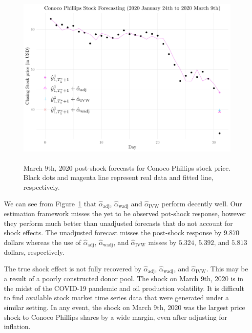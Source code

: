 \documentclass[11pt,3p,review,authoryear]{elsarticle}
\theoremstyle{definition}
\begin{document}
\begin{figure}[t!]
  \begin{center}
    \includegraphics[height = 9cm]{FIG2.pdf}
    \caption{March 9th, 2020 post-shock forecasts for Conoco Phillips stock price. Black dots and magenta line represent real data and fitted line, respectively.}
    \label{Fig:CP}
  \end{center}  
  \vspace{-.6cm}
\end{figure}


We can see from Figure~\ref{Fig:CP} that $\hat{\alpha}_{\text{adj}}$, $\hat{\alpha}_{\text{wadj}}$ and $\hat{\alpha}_{\text{IVW}}$ perform decently well. Our estimation framework misses the yet to be observed pot-shock response, however they perform much better than unadjusted forecasts that do not account for shock effects. The unadjusted forecast misses the post-shock response by 9.870 dollars whereas 
the use of $\hat{\alpha}_{\text{adj}}$, $\hat{\alpha}_{\text{wadj}}$, and $\hat{\alpha}_{\text{IVW}}$ misses by $5.324$, $5.392$, and $5.813$ dollars, respectively. 

The true shock effect is not fully recovered by $\hat{\alpha}_{\text{adj}}$, $\hat{\alpha}_{\text{wadj}}$, and $\hat{\alpha}_{\text{IVW}}$. This may be a result of a poorly constructed donor pool. The shock on March 9th, 2020 is in the midst of the COVID-19 pandemic and oil production volatility. It is difficult to find available stock market time series data that were generated under a similar setting. In any event, the shock on March 9th, 2020 was the largest price shock to Conoco Phillips shares by a wide margin, even after adjusting for inflation.
\end{document}
